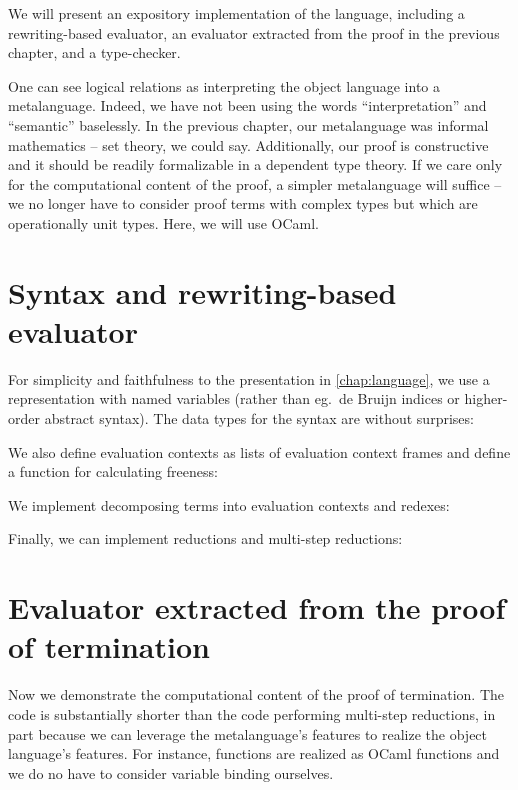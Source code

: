 \documentclass[a4paper, 11pt,titlepage, openright, twoside]{report}
\newcommand{\+}{\enspace}
\begin{document}
We will present an expository implementation of the language,
including a rewriting-based evaluator, an evaluator extracted from the proof in the previous chapter,
and a type-checker.

One can see logical relations as interpreting the object language into a metalanguage.
Indeed, we have not been using the words ``interpretation'' and ``semantic'' baselessly.
In the previous chapter, our metalanguage was informal mathematics – set theory, we could say.
Additionally, our proof is constructive and it should be readily formalizable in a dependent type theory.
If we care only for the computational content of the proof, a simpler metalanguage will suffice –
we no longer have to consider proof terms with complex types but which are operationally unit types.
Here, we will use OCaml.

\section{Syntax and rewriting-based evaluator}

For simplicity and faithfulness to the presentation in \autoref{chap:language},
we use a representation with named variables (rather than eg.\ de Bruijn indices
or higher-order abstract syntax).
The data types for the syntax are without surprises:



We also define evaluation contexts as lists of evaluation context frames
and define a function for calculating freeness:



We implement decomposing terms into evaluation contexts and redexes:



Finally, we can implement reductions and multi-step reductions:



\section{Evaluator extracted from the proof of termination}

Now we demonstrate the computational content of the proof of termination.
The code is substantially shorter than the code performing multi-step reductions, in part because we can leverage
the metalanguage's features to realize the object language's features.
For instance, functions are realized as OCaml functions and
we do no have to consider variable binding ourselves.
\end{document}

